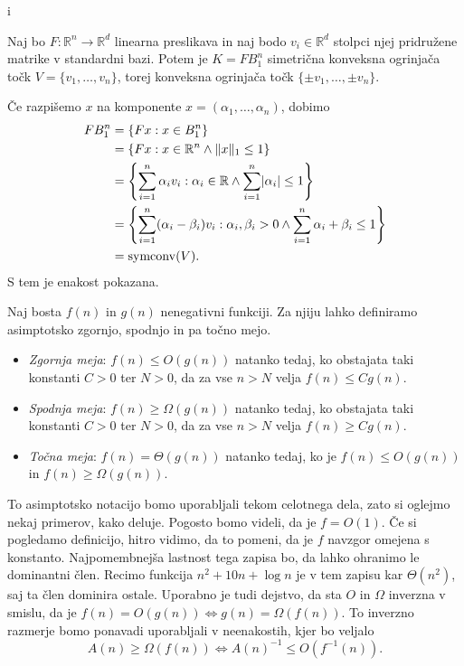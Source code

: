 i\documentclass[mat1]{fmfdelo}
\DeclarePairedDelimiter{\abs}{\lvert}{\rvert}
\DeclarePairedDelimiter{\norm}{\lVert}{\rVert}
\newcommand{\R}{\mathbb R}
\newcommand{\query}{F: \R^n \to \R^d}
\begin{document}
\begin{lema} \label{symabs}
    Naj bo $\query$ linearna preslikava in naj bodo $v_i \in \R^d$ stolpci njej pridružene matrike v standardni bazi. Potem je $K=FB_1^n$ simetrična konveksna ogrinjača točk $V= \{v_1,\dots,v_n\}$, torej konveksna ogrinjača točk $\{\pm v_1,\dots,\pm v_n\}$.
\end{lema}
\begin{dokaz}
    Če razpišemo $x$ na komponente $x = (\alpha_1,\dots,\alpha_n)$, dobimo
    \begin{align*}
        FB_1^n &= \{Fx: x \in B_1^n\} \\
        &= \{Fx: x \in \R^n \wedge \norm{x}_1 \leq 1\} \\
        &= \left\{ \sum_{i=1}^n \alpha_i v_i : \alpha_i \in \R \wedge \sum_{i=1}^n \abs{\alpha_i} \leq 1 \right\} \\
        &= \left\{ \sum_{i=1}^n (\alpha_i - \beta_i) v_i : \alpha_i,\beta_i > 0 \wedge \sum_{i=1}^n \alpha_i + \beta_i \leq 1 \right\} \\
        &= \operatorname{symconv}(V).
    \end{align*}
    S tem je enakost pokazana.
\end{dokaz}

\begin{definicija}
    Naj bosta $f(n)$ in $g(n)$ nenegativni funkciji. Za njiju lahko definiramo asimptotsko zgornjo, spodnjo in pa točno mejo.
    \begin{itemize}
        \item {\em Zgornja meja}: $f(n)\leq O(g(n))$ natanko tedaj, ko obstajata taki konstanti $C>0$ ter $N>0$, da za vse $n>N$ velja $f(n)\leq C g(n)$.
        \item {\em Spodnja meja}: $f(n)\geq \Omega(g(n))$ natanko tedaj, ko obstajata taki konstanti $C>0$ ter $N>0$, da za vse $n>N$ velja $f(n)\geq C g(n)$.
        \item {\em Točna meja}: $f(n)=\Theta(g(n))$ natanko tedaj, ko je $f(n)\leq O(g(n))$ in $f(n)\geq \Omega(g(n))$.
    \end{itemize}
\end{definicija}

\begin{opomba}
    To asimptotsko notacijo bomo uporabljali tekom celotnega dela, zato si oglejmo nekaj primerov, kako deluje. Pogosto bomo videli, da je $f=O(1)$. Če si pogledamo definicijo, hitro vidimo, da to pomeni, da je $f$ navzgor omejena s konstanto. Najpomembnejša lastnost tega zapisa bo, da lahko ohranimo le dominantni člen. Recimo funkcija $n^2+10n+\log n$ je v tem zapisu kar $\Theta(n^2)$, saj ta člen dominira ostale. Uporabno je tudi dejstvo, da sta $O$ in $\Omega$ inverzna v smislu, da je $f(n)=O(g(n)) \iff g(n) = \Omega(f(n))$. To inverzno razmerje bomo ponavadi uporabljali v neenakostih, kjer bo veljalo
    \begin{equation*}
        A(n) \geq \Omega(f(n)) \iff A(n)^{-1} \leq O(f^{-1}(n)).
    \end{equation*}
\end{opomba}
\end{document}
